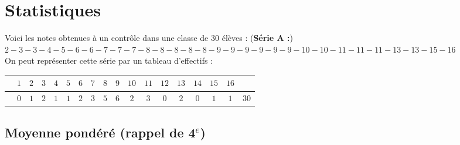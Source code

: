 \documentclass[a4paper,10pt]{report}
\begin{document}
\newpage
\setcounter{chapter}{3}
\chapter{Statistiques}

\begin{ex}
   Voici les notes obtenues à un contrôle dans une classe de $30$ élèves : (\textbf{Série A :}) \\ $2-3-3-4-5-6-6-7-7-7-8-8-8-8-8-9-9-9-9-9-9-10-10-11-11-11-13-13-15-16$ \\     
   On peut représenter cette série par un tableau d'effectifs :\\

\vspace{-3mm}
\begin{center}
   \renewcommand{\arraystretch}{1.5}   
   \begin{tabular}{|c|*{16}{C{0.4}|}c|}
      \hline       
       & $1$ & $2$ & $3$ & $4$ & $5$ & $6$ & $7$ & $8$ & $9$ & $10$ & $11$ & $12$ & $13$ & $14$ & $15$ & $16$ &  \\
      \hline
       & $0$ & $1$ & $2$ & $1$ & $1$ & $2$ & $3$ & $5$ & $6$ & $2$ & $3$ & $0$ & $2$ & $0$ & $1$ & $1$ & $30$ \\ 
      \hline
   \end{tabular}
\end{center}
\end{ex}

\vspace{-4mm}
\section{Moyenne pondéré (rappel de 4$^e$)}
\end{document}
